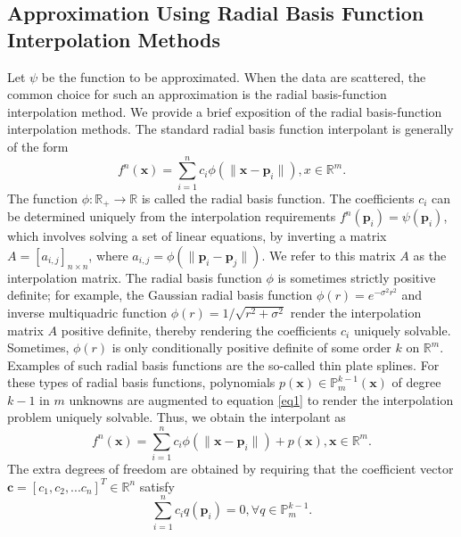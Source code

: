 \documentclass[multixcb]{amstext-l}
\theoremstyle{plain}
\theoremstyle{definition}
\theoremstyle{definition}
\theoremstyle{remark}
\numberwithin{equation}{chapter}
\begin{document}
\subsection{Approximation Using Radial Basis Function Interpolation Methods}
Let $\psi$ be the function to be approximated. When the data are scattered, the common choice for such an approximation is the radial basis-function interpolation method. We provide a brief exposition of the radial basis-function interpolation methods. The standard radial basis function interpolant is generally of the form 
\begin{equation}\label{eq1}
    f^n(\boldsymbol{x}) = \sum_{i=1}^n c_i\phi(\|\boldsymbol{x}-\boldsymbol{p}_i\|), x\in\mathbb{R}^m.
\end{equation}
The function $\phi:\mathbb{R}_+\to\mathbb{R}$ is called the radial basis function. The coefficients $c_i$ can be determined uniquely from the interpolation requirements $f^n(\boldsymbol{p}_i) = \psi(\boldsymbol{p}_i)$, which involves solving a set of linear equations, by inverting a matrix $A = [a_{i,j}]_{n\times n}$, where $a_{i,j} = \phi(\|\boldsymbol{p}_i-\boldsymbol{p}_j\|)$. We refer to this matrix $A$ as the interpolation matrix. The radial basis function $\phi$ is sometimes strictly positive definite; for example, the Gaussian radial basis function $\phi(r) = e^{-\sigma^2 r^2}$ and inverse multiquadric function $\phi(r) = 1/\sqrt{r^2+\sigma^2}$ render the interpolation matrix $A$ positive definite, thereby rendering the coefficients $c_i$ uniquely solvable. Sometimes, $\phi(r)$ is only conditionally positive definite of some order $k$ on $\mathbb{R}^m$. Examples of such radial basis functions are the so-called thin plate splines. For these types of radial basis functions, polynomials $p(\boldsymbol{x}) \in \mathbb{P}^{k-1}_m(\boldsymbol{x})$ of degree $k-1$ in $m$ unknowns are augmented to equation \ref{eq1} to render the interpolation problem uniquely solvable. Thus, we obtain the interpolant as
\begin{equation}\label{eq2}
    f^n(\boldsymbol{x}) = \sum_{i=1}^n c_i\phi(\|\boldsymbol{x}-\boldsymbol{p}_i\|) + p(\boldsymbol{x}), \boldsymbol{x}\in \mathbb{R}^m.
\end{equation} 
The extra degrees of freedom are obtained by requiring that the coefficient vector $\boldsymbol{c} = [c_1,c_2,...c_n]^T \in \mathbb{R}^n$ satisfy 
\begin{equation}\label{eq3}
    \sum_{i=1}^nc_iq(\boldsymbol{p}_i) = 0, \forall q\in\mathbb{P}^{k-1}_m.
\end{equation}
\end{document}
